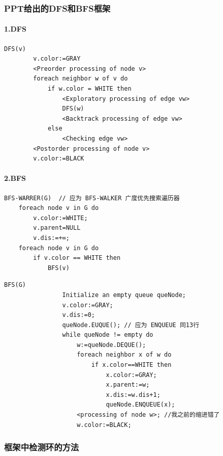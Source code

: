 \documentclass{article}
\begin{document}
\pagebreak

\subsubsection{PPT给出的DFS和BFS框架}

\paragraph{1.DFS}

\begin{lstlisting}[style=algorithmPPT]
    DFS(v)
        v.color:=GRAY
        <Preorder processing of node v>
        foreach neighbor w of v do
            if w.color = WHITE then
                <Exploratory processing of edge vw>
                DFS(w)
                <Backtrack processing of edge vw>
            else
                <Checking edge vw>
        <Postorder processing of node v>
        v.color:=BLACK
    \end{lstlisting}

\paragraph{2.BFS}

\begin{lstlisting}[style=algorithmPPT]
    BFS-WARRER(G)  // 应为 BFS-WALKER 广度优先搜索遍历器
    foreach node v in G do
        v.color:=WHITE; 
        v.parent=NULL 
        v.dis:=+∞;
    foreach node v in G do
        if v.color == WHITE then
            BFS(v)
\end{lstlisting}

\begin{lstlisting}[style=algorithmPPT]
            BFS(G)
                Initialize an empty queue queNode;
                v.color:=GRAY;
                v.dis:=0;
                queNode.EUQUE(); // 应为 ENQUEUE 同13行
                while queNode != empty do
                    w:=queNode.DEQUE();
                    foreach neighbor x of w do
                        if x.color==WHITE then
                            x.color:=GRAY;
                            x.parent:=w;
                            x.dis:=w.dis+1;
                            queNode.ENQUEUE(x);
                    <processing of node w>; //我之前的缩进错了
                    w.color:=BLACK;
\end{lstlisting}

\pagebreak

\subsubsection{框架中检测环的方法}
\end{document}
